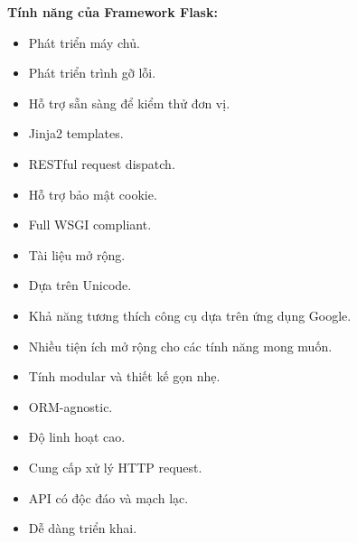 \textbf{Tính năng của Framework Flask:}
\begin{itemize}
    \item Phát triển máy chủ.
    \item Phát triển trình gỡ lỗi.
    \item Hỗ trợ sẵn sàng để kiểm thử đơn vị.
    \item Jinja2 templates.
    \item RESTful request dispatch.
    \item Hỗ trợ bảo mật cookie.
    \item Full WSGI compliant.
    \item Tài liệu mở rộng.
    \item Dựa trên Unicode.
    \item Khả năng tương thích công cụ dựa trên ứng dụng Google.
    \item Nhiều tiện ích mở rộng cho các tính năng mong muốn.
    \item Tính modular và thiết kế gọn nhẹ.
    \item ORM-agnostic.
    \item Độ linh hoạt cao.
    \item Cung cấp xử lý HTTP request.
    \item API có độc đáo và mạch lạc.
    \item Dễ dàng triển khai.
\end{itemize}

